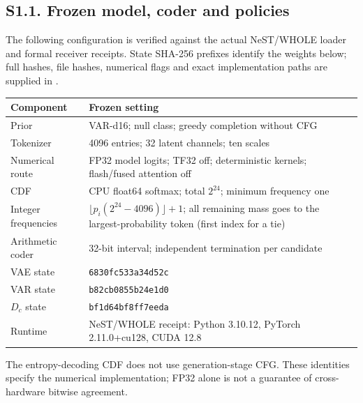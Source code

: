 \documentclass[11pt,letterpaper]{article}
\begin{document}
\clearpage\subsection*{S1.1. Frozen model, coder and policies}
The following configuration is verified against the actual NeST/WHOLE loader and formal receiver receipts. State SHA-256 prefixes identify the weights below; full hashes, file hashes, numerical flags and exact implementation paths are supplied in .
\begin{center}\small\renewcommand{\arraystretch}{1.2}
\begin{tabular}{p{1.45in}p{4.75in}}\toprule
Component & Frozen setting\\\midrule
Prior & VAR-d16; null class; greedy completion without CFG\\
Tokenizer & 4096 entries; 32 latent channels; ten scales\\
Numerical route & FP32 model logits; TF32 off; deterministic kernels; flash/fused attention off\\
CDF & CPU float64 softmax; total $2^{24}$; minimum frequency one\\
Integer frequencies & $\lfloor p_i(2^{24}-4096)\rfloor+1$; all remaining mass goes to the largest-probability token (first index for a tie)\\
Arithmetic coder & 32-bit interval; independent termination per candidate\\

VAE state & \texttt{6830fc533a34d52c}\\
VAR state & \texttt{b82cb0855b24e1d0}\\
$D_c$ state & \texttt{bf1d64bf8ff7eeda}\\

Runtime & NeST/WHOLE receipt: Python 3.10.12, PyTorch 2.11.0+cu128, CUDA 12.8\\\bottomrule
\end{tabular}\end{center}
The entropy-decoding CDF does not use generation-stage CFG. These identities specify the numerical implementation; FP32 alone is not a guarantee of cross-hardware bitwise agreement.
\end{document}
